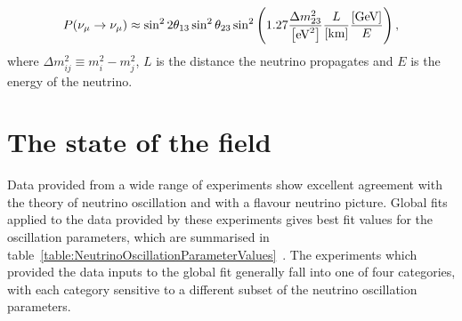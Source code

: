\begin{equation}
  \Yoshi{P(\nu_\mu \rightarrow \nu_\mu) \approx \sin^{2}2\theta_{13}\sin^{2}\theta_{23}\sin^2\left(1.27\frac{\Delta m^{2}_{23}}{\left[\textrm{eV}^2\right]}\frac{L}{\left[\textrm{km}\right]}\frac{\left[\textrm{GeV}\right]}{E}\right),}{ADDRESSED - would units not be in square brackets?}
  \label{eq:ElectronNeutrinoAppearanceProbability}
\end{equation}
where $\Delta m^{2}_{ij} \equiv m^{2}_{i} - m^{2}_{j}$, $L$ is the distance the neutrino propagates and $E$ is the energy of the neutrino.

\section{The state of the field}
\label{sec:StateOfTheField}
Data provided from a wide range of experiments show excellent agreement with the theory of neutrino oscillation and with a flavour neutrino picture.  Global fits applied to the data provided by these experiments gives best fit values for the oscillation parameters, which are summarised in table~\ref{table:NeutrinoOscillationParameterValues}~\cite{Agashe:2014kda}.  The experiments which provided the data inputs to the global fit generally fall into one of four categories, with each category sensitive to a different subset of the neutrino oscillation parameters.
